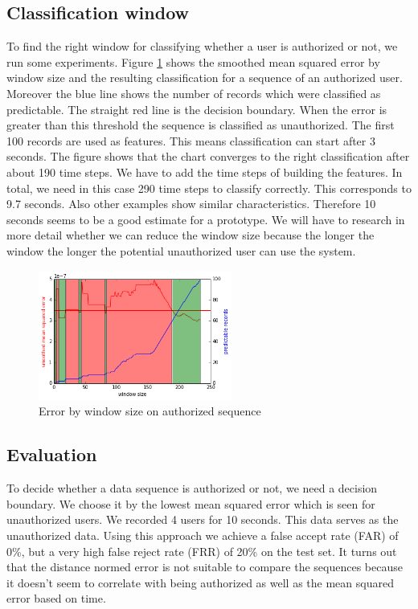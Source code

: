 \documentclass[conference]{IEEEtran}
\begin{document}
\subsection{Classification window}
To find the right window for classifying whether a user is authorized or not, we run some experiments. Figure \ref{fig_window} shows the smoothed mean squared error by window size and the resulting classification for a sequence of an authorized user. Moreover the blue line shows the number of records which were classified as predictable. The straight red line is the decision boundary. When the error is greater than this threshold the sequence is classified as unauthorized. The first 100 records are used as features. This means classification can start after 3 seconds. The figure shows that the chart converges to the right classification after about 190 time steps. We have to add the time steps of building the features. In total, we need in this case 290 time steps to classify correctly. This corresponds to 9.7 seconds. Also other examples show similar characteristics. Therefore 10 seconds seems to be a good estimate for a prototype. We will have to research in more detail whether we can reduce the window size because the longer the window the longer the potential unauthorized user can use the system.

\begin{figure}[!t]
\centering
\includegraphics[width=2.5in]{img/window_size1.png}
\caption{Error by window size on authorized sequence}
\label{fig_window}
\end{figure}

\subsection{Evaluation}
To decide whether a data sequence is authorized or not, we need a decision boundary. We choose it by the lowest mean squared error which is seen for unauthorized users. We recorded 4 users for 10 seconds. This data serves as the unauthorized data. Using this approach we achieve a false accept rate (FAR) of 0\%, but a very high false reject rate (FRR) of 20\% on the test set. It turns out that the distance normed error is not suitable to compare the sequences because it doesn't seem to correlate with being authorized as well as the mean squared error based on time.
\end{document}
